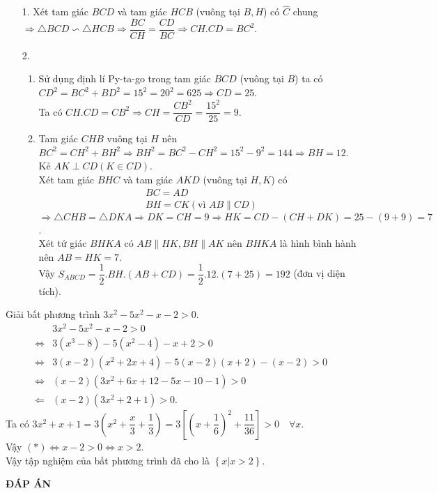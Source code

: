 \begin{ex}
{\begin{center}
\begin{tikzpicture}
    	\end{tikzpicture}
    \end{center}
    \begin{enumerate}
     \item[1.]  Xét tam giác $BCD$ và tam giác $HCB$ (vuông tại $B,H$) có $\widehat{C}$ chung\\ $\Rightarrow \triangle BCD\backsim \triangle HCB\Rightarrow \dfrac{BC}{CH}=\dfrac{CD}{BC}\Rightarrow CH.CD=BC^2$. 
\item[2.]
\begin{enumerate}
	\item Sử dụng định lí Py-ta-go trong tam giác $BCD$ (vuông tại $B$) ta có\\
	$CD^2=BC^2+BD^2=15^2=20^2=625\Rightarrow CD=25$.\\
	Ta có $CH.CD=CB^2\Rightarrow CH=\dfrac{CB^2}{CD}=\dfrac{15^2}{25}=9$.
	\item 
	Tam giác $CHB$ vuông tại $H$ nên $BC^2=CH^2+BH^2\Rightarrow BH^2=BC^2-CH^2=15^2-9^2=144\Rightarrow BH=12$.\\
	Kẻ $AK\perp CD(K\in CD)$.\\
	Xét tam giác $BHC$ và tam giác $AKD$ (vuông tại $H,K$) có
	\begin{align*}
	&BC=AD\\
	&BH=CK(\text{vì $AB\parallel CD$})
	\end{align*}
	$\Rightarrow \triangle CHB=\triangle DKA\Rightarrow DK=CH=9\Rightarrow HK=CD-(CH+DK)=25-(9+9)=7$.\\
	Xét tứ giác $BHKA$ có $AB\parallel HK,BH\parallel AK$ nên $BHKA$ là hình bình hành nên $AB=HK=7$.\\
	Vậy $S_{ABCD}=\dfrac{1}{2}.BH.(AB+CD)=\dfrac{1}{2}.12.(7+25)=192$ (đơn vị diện tích).
\end{enumerate}
     
    \end{enumerate}
    }
\end{ex}

\begin{ex}%
    Giải bất phương trình $3x^2-5x^2-x-2>0$.
\loigiai
    {
    \begin{align*}
    &3x^2-5x^2-x-2>0\\
    \Leftrightarrow &3(x^3-8)-5(x^2-4)-x+2>0\\
    \Leftrightarrow &3(x-2)(x^2+2x+4)-5(x-2)(x+2)-(x-2)>0\\
    \Leftrightarrow&(x-2)(3x^2+6x+12-5x-10-1)>0\\
    \Leftarrow&(x-2)(3x^2+2+1)>0\tag{*}.
    \end{align*}
    Ta có $3x^2+x+1=3\left( x^2+\dfrac{x}{3}+\dfrac{1}{3}\right) =3\left[\left(x+\dfrac{1}{6} \right)^2+\dfrac{11}{36}  \right]>0\quad\forall x.$\\
    Vậy $(*)\Leftrightarrow x-2>0\Leftrightarrow x>2$.\\
    Vậy tập nghiệm của bất phương trình đã cho là $\left\lbrace x|x>2 \right\rbrace $. 
    }
\end{ex}

\newpage
\begin{center}
	\textbf{ĐÁP ÁN}
\end{center}
\begin{multicols}{10}
	 
\end{multicols}
